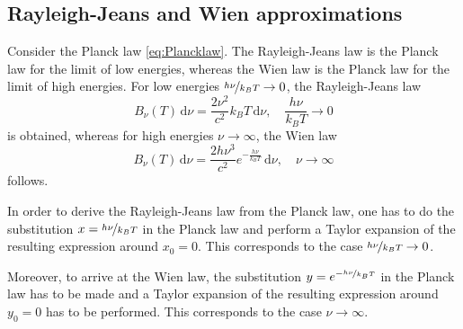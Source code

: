 \documentclass[a4paper,12pt]{report}
\begin{document}
\subsection{Rayleigh-Jeans and Wien approximations}
Consider the Planck law \cref{eq:Plancklaw}. The Rayleigh-Jeans law is the Planck law for the limit of low energies, whereas the Wien law is the Planck law for the limit of high energies. For low energies $\nicefrac{h\nu}{k_BT} \rightarrow 0$, the Rayleigh-Jeans law \begin{equation}\label{eq:RayleighJeanslaw}
B_\nu(T)\,\mathrm{d}\nu = \frac{2\nu^2}{c^2}k_BT\,\mathrm{d}\nu, \quad \frac{h\nu}{k_B T} \rightarrow 0
\end{equation} is obtained, whereas for high energies $\nu \rightarrow \infty$, the Wien law \begin{equation}\label{eq:Wienlaw}
    B_\nu(T)\,\mathrm{d}\nu = \frac{2h\nu^3}{c^2}e^{-\frac{h\nu}{k_BT}}\,\mathrm{d}\nu, \quad \nu \rightarrow \infty
\end{equation} follows. 

In order to derive the Rayleigh-Jeans law from the Planck law, one has to do the substitution $x = \nicefrac{h\nu}{k_BT}$ in the Planck law and perform a Taylor expansion of the resulting expression around $x_0 = 0$. This corresponds to the case $\nicefrac{h\nu}{k_BT} \rightarrow 0$. 

Moreover, to arrive at the Wien law, the substitution $y = e^{-\nicefrac{h\nu}{k_BT}}$ in the Planck law has to be made and a Taylor expansion of the resulting expression around $y_0 =0$ has to be performed. This corresponds to the case $\nu \rightarrow \infty$.
\end{document}

